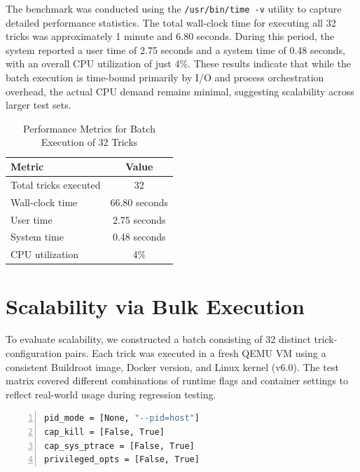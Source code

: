 \documentclass[12pt]{report}
\begin{document}
\begin{doublespace}
The benchmark was conducted using the \texttt{/usr/bin/time -v} utility to capture detailed performance statistics. The total wall-clock time for executing all 32 tricks was approximately 1 minute and 6.80 seconds. During this period, the system reported a user time of 2.75 seconds and a system time of 0.48 seconds, with an overall CPU utilization of just 4\%. These results indicate that while the batch execution is time-bound primarily by I/O and process orchestration overhead, the actual CPU demand remains minimal, suggesting scalability across larger test sets.

\begin{table}[ht]
\centering
\caption{Performance Metrics for Batch Execution of 32 Tricks}
\label{tab:batch-execution}
\begin{tabular}{|l|c|}
\hline
\textbf{Metric}         & \textbf{Value} \\
\hline
Total tricks executed   & 32 \\
Wall-clock time         & 66.80 seconds \\
User time               & 2.75 seconds \\
System time             & 0.48 seconds \\
CPU utilization         & 4\% \\
\hline
\end{tabular}
\end{table}



















\section{Scalability via Bulk Execution}

To evaluate scalability, we constructed a batch consisting of 32 distinct trick-configuration pairs. Each trick was executed in a fresh QEMU VM using a consistent Buildroot image, Docker version, and Linux kernel (v6.0). The test matrix covered different combinations of runtime flags and container settings to reflect real-world usage during regression testing.

\begin{lstlisting}[language=bash, caption={Trick Configuration Parameters}, label={lst:escape-trick}, numbers=left, numberstyle=\tiny, stepnumber=1, frame=single, breaklines=true, backgroundcolor=\color{gray!10}, basicstyle=\ttfamily\footnotesize, showspaces=false, showstringspaces=false]
pid_mode = [None, "--pid=host"]
cap_kill = [False, True]
cap_sys_ptrace = [False, True]
privileged_opts = [False, True]
\end{lstlisting}


\end{doublespace}
\end{document}
